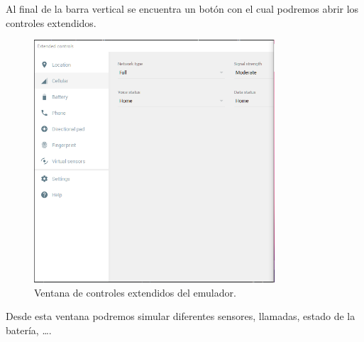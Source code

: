 Al final de la barra vertical se encuentra un botón con el cual podremos abrir los controles extendidos.

\begin{figure}[H]
\centering
  \includegraphics[width=0.8\textwidth]{Figures/anexo/android_tools/emulator_extended_controls}
  \caption{Ventana de controles extendidos del emulador.}
\end{figure}

Desde esta ventana podremos simular diferentes sensores, llamadas, estado de la batería, \ldots.
